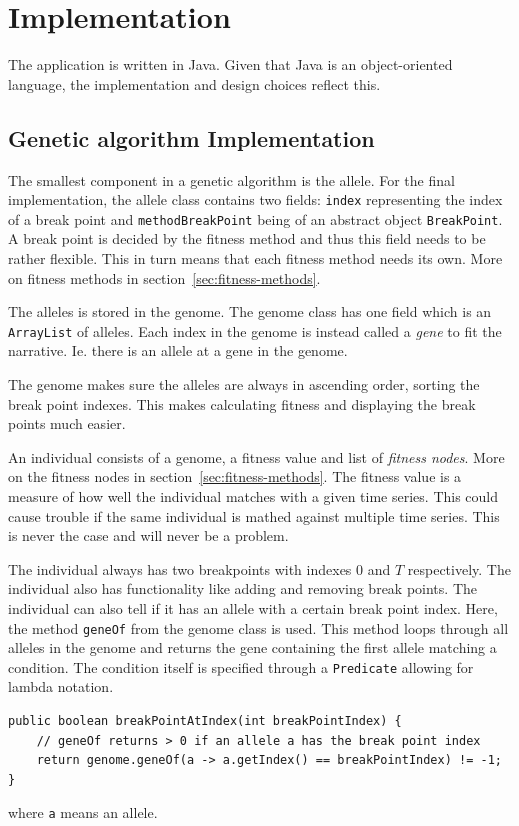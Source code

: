 
\section{Implementation} \label{sec:implementation}

The application is written in Java. Given that Java is an object-oriented
language, the implementation and design choices reflect this. 

\subsection{Genetic algorithm Implementation}

The smallest component in a genetic algorithm is the allele. For the final implementation, the
allele class contains two fields: \texttt{index} representing the index of a
break point and \texttt{methodBreakPoint} being of an abstract object
\texttt{BreakPoint}. A break point is decided by the fitness method and thus
this field needs to be rather flexible. This in turn means that each fitness
method needs its own. More on fitness methods in
section~\ref{sec:fitness-methods}. 

The alleles is stored in the genome. The genome class has one field which is an
\texttt{ArrayList} of alleles. Each index in the genome is instead called a
\textit{gene} to fit the narrative. Ie. there is an allele at a gene in the
genome. 

The genome makes sure the alleles are always in ascending order, sorting the break
point indexes. This makes calculating fitness and displaying the break points
much easier. 

An individual consists of a genome, a fitness value and list of \textit{fitness nodes}.
More on the fitness nodes in section~\ref{sec:fitness-methods}. The fitness
value is a measure of how well the individual matches with a given time series.
This could cause trouble if the same individual is mathed against multiple time
series. This is never the case and will never be a problem. 

The individual always has two breakpoints with indexes $0$ and $T$ respectively.
The individual also has functionality like adding and removing break points. The
individual can also tell if it has an allele with a certain break point index.
Here, the method \texttt{geneOf} from the genome class is used. This method
loops through all alleles in the genome and returns the gene containing the first allele matching a
condition. The condition itself is specified through a \texttt{Predicate}
allowing for lambda notation. 
\begin{lstlisting}
public boolean breakPointAtIndex(int breakPointIndex) {
    // geneOf returns > 0 if an allele a has the break point index
    return genome.geneOf(a -> a.getIndex() == breakPointIndex) != -1;
}
\end{lstlisting}
where \texttt{a} means an allele. 


